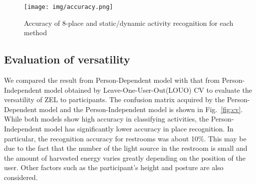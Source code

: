 \documentclass[conference]{IEEEtran}
\begin{document}
\begin{figure}[bt]
    \centering
    \texttt{[image: img/accuracy.png]}
    \caption{Accuracy of 8-place and static/dynamic activity recognition for each method}
    \label{fig:10fold_accuracy}
\end{figure}

\subsection{Evaluation of versatility}
We compared the result from Person-Dependent model with that from Person-Independent model obtained by Leave-One-User-Out(LOUO) CV to evaluate the versatility of ZEL to participants.
The confusion matrix acquired by the Person-Dependent model and the Person-Independent model is shown in Fig.~\ref{fig:cv}.
While both models show high accuracy in classifying activities, the Person-Independent model has significantly lower accuracy in place recognition.
In particular, the recognition accuracy for restrooms was about 10\%.
This may be due to the fact that the number of the light source in the restroom is small and the amount of harvested energy varies greatly depending on the position of the user.
Other factors such as the participant's height and posture are also considered.
\end{document}
